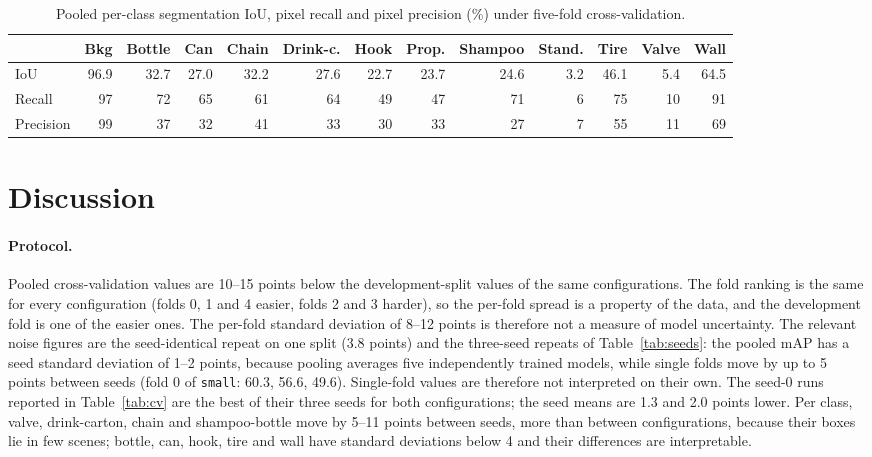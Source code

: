 \documentclass[11pt,a4paper]{article}
\newcommand{\cfg}[1]{\texttt{#1}}
\begin{document}
\begin{table}[h]
  \centering
  \small
  \setlength{\tabcolsep}{4pt}
  \begin{tabular}{lrrrrrrrrrrrr}
    \toprule
    & Bkg & Bottle & Can & Chain & Drink-c. & Hook & Prop. & Shampoo & Stand. & Tire & Valve & Wall \\
    \midrule
    IoU & 96.9 & 32.7 & 27.0 & 32.2 & 27.6 & 22.7 & 23.7 & 24.6 & 3.2 & 46.1 & 5.4 & 64.5 \\
    Recall & 97 & 72 & 65 & 61 & 64 & 49 & 47 & 71 & 6 & 75 & 10 & 91 \\
    Precision & 99 & 37 & 32 & 41 & 33 & 30 & 33 & 27 & 7 & 55 & 11 & 69 \\
    \bottomrule
  \end{tabular}
  \caption{Pooled per-class segmentation IoU, pixel recall and pixel
  precision (\%) under five-fold cross-validation.}
  \label{tab:segclass}
\end{table}

\section{Discussion}

\paragraph{Protocol.} Pooled cross-validation values are 10--15 points below
the development-split values of the same configurations. The fold ranking
is the same for every configuration (folds 0, 1 and 4 easier, folds 2 and 3
harder), so the per-fold spread is a property of the data, and the
development fold is one of the easier ones. The per-fold standard deviation
of 8--12 points is therefore not a measure of model uncertainty. The relevant
noise figures are the seed-identical repeat on one split (3.8 points) and
the three-seed repeats of Table~\ref{tab:seeds}: the pooled mAP has a seed
standard deviation of 1--2 points, because pooling averages five
independently trained models, while single folds move by up to 5 points
between seeds (fold 0 of \cfg{small}: 60.3, 56.6, 49.6). Single-fold
values are therefore not interpreted on their own. The seed-0 runs
reported in Table~\ref{tab:cv} are the best of their three seeds for both
configurations; the seed means are 1.3 and 2.0 points lower. Per class,
valve, drink-carton, chain and shampoo-bottle move by 5--11 points between
seeds, more than between configurations, because their boxes lie in few
scenes; bottle, can, hook, tire and wall have standard deviations below 4
and their differences are interpretable.
\end{document}
